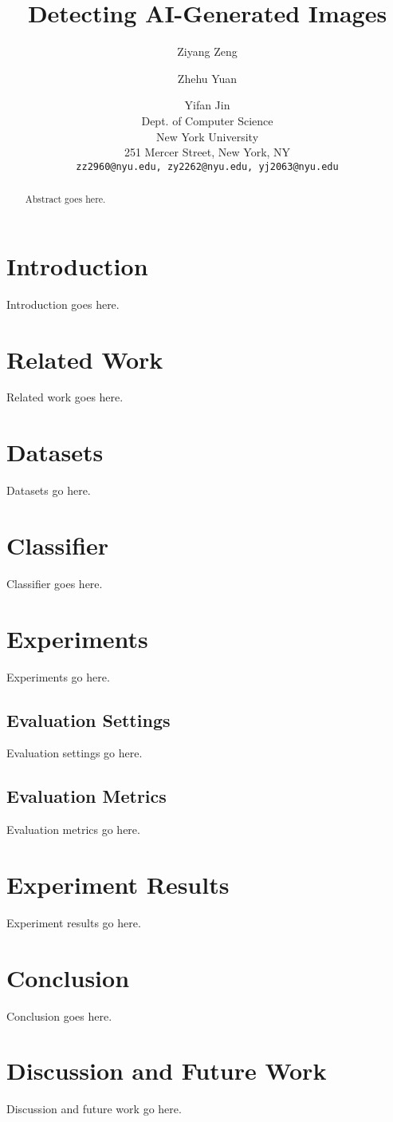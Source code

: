 \documentclass[11pt]{article}
\title{Detecting AI-Generated Images}
\author{Ziyang Zeng \and Zhehu Yuan \and Yifan Jin \\
  Dept. of Computer Science \\
  New York University \\
  251 Mercer Street, New York, NY \\
  \texttt{zz2960@nyu.edu, zy2262@nyu.edu, yj2063@nyu.edu}}
\begin{document}
\maketitle
\begin{abstract}
  Abstract goes here.
\end{abstract}

\section{Introduction}

Introduction goes here.


\section{Related Work}

Related work goes here.

\section{Datasets}

Datasets go here.

\section{Classifier}

Classifier goes here.

\section{Experiments}

Experiments go here.

\subsection{Evaluation Settings}

Evaluation settings go here.

\subsection{Evaluation Metrics}

Evaluation metrics go here.

\section{Experiment Results}

Experiment results go here.

\section{Conclusion}

Conclusion goes here.

\section{Discussion and Future Work}

Discussion and future work go here.



\end{document}
